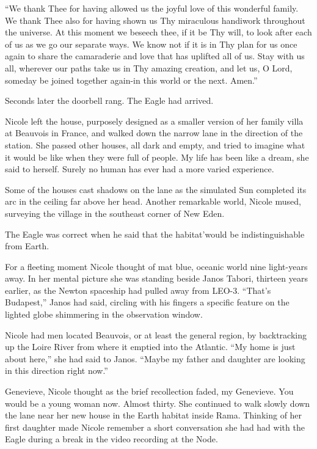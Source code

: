\documentclass[]{article}
\begin{document}
{“We thank Thee for having allowed us the joyful love of this wonderful family. We thank Thee also for having shown us Thy miraculous handiwork throughout the universe. At this moment we beseech thee, if it be Thy will, to look after each of us as we go our separate ways. We know not if it is in Thy plan for us once again to share the camaraderie and love that has uplifted all of us. Stay with us all, wherever our paths take us in Thy amazing creation, and let us, O Lord, someday be joined together again-in this world or the next. Amen.”

Seconds later the doorbell rang. The Eagle had arrived.

Nicole left the house, purposely designed as a smaller version of her family villa at Beauvois in France, and walked down the narrow lane in the direction of the station. She passed other houses, all dark and empty, and tried to imagine what it would be like when they were full of people. My life has been like a dream, she said to herself. Surely no human has ever had a more varied experience.

Some of the houses cast shadows on the lane as the simulated Sun completed its arc in the ceiling far above her head. Another remarkable world, Nicole mused, surveying the village in the southeast corner of New Eden.

The Eagle was correct when he said that the habitat’would be indistinguishable from Earth.

For a fleeting moment Nicole thought of mat blue, oceanic world nine light-years away. In her mental picture she was standing beside Janos Tabori, thirteen years earlier, as the Newton spaceship had pulled away from LEO-3. “That’s Budapest,” Janos had said, circling with his fingers a specific feature on the lighted globe shimmering in the observation window.

Nicole had men located Beauvois, or at least the general region, by backtracking up the Loire River from where it emptied into the Atlantic. “My home is just about here,” she had said to Janos. “Maybe my father and daughter are looking in this direction right now.”

Genevieve, Nicole thought as the brief recollection faded, my Genevieve. You would be a young woman now. Almost thirty. She continued to walk slowly down the lane near her new house in the Earth habitat inside Rama. Thinking of her first daughter made Nicole remember a short conversation she had had with the Eagle during a break in the video recording at the Node.

}
\end{document}
